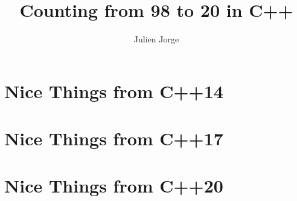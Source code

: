 \documentclass{book}
\title{Counting from 98 to 20 in C++}
\author{Julien Jorge}
\begin{document}
\maketitle

\tableofcontents





\chapter{Nice Things from C++14}
\chapter{Nice Things from C++17}
\chapter{Nice Things from C++20}
\end{document}
